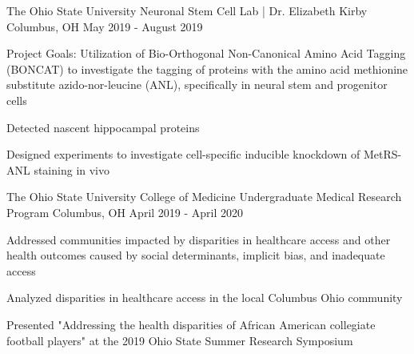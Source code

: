 

\begin{cventries}

  \cventry
    {The Ohio State University} %
    {Neuronal Stem Cell Lab | Dr. Elizabeth Kirby} %
    {Columbus, OH} %
    {May 2019 - August 2019} %
    {
      \begin{cvitems} %
        \item {Project Goals: Utilization of Bio-Orthogonal Non-Canonical Amino Acid Tagging (BONCAT) to investigate the tagging of proteins with the amino acid methionine substitute azido-nor-leucine (ANL), specifically in neural stem and progenitor cells}
        \item {Detected nascent hippocampal proteins}
        \item {Designed experiments to investigate cell-specific inducible knockdown of MetRS-ANL staining in vivo}
      \end{cvitems}
    }

  \cventry
    {The Ohio State University College of Medicine} %
    {Undergraduate Medical Research Program} %
    {Columbus, OH} %
    {April 2019 - April 2020} %
    {
      \begin{cvitems} %
        \item {Addressed communities impacted by disparities in healthcare access and other health outcomes
 caused by social determinants, implicit bias, and inadequate access}
        \item {Analyzed disparities in healthcare access in the local Columbus Ohio community}
        \item {Presented "Addressing the health disparities of African American collegiate football players" at the 2019 Ohio State Summer Research Symposium}
      \end{cvitems}
    }

 
 









\end{cventries}
